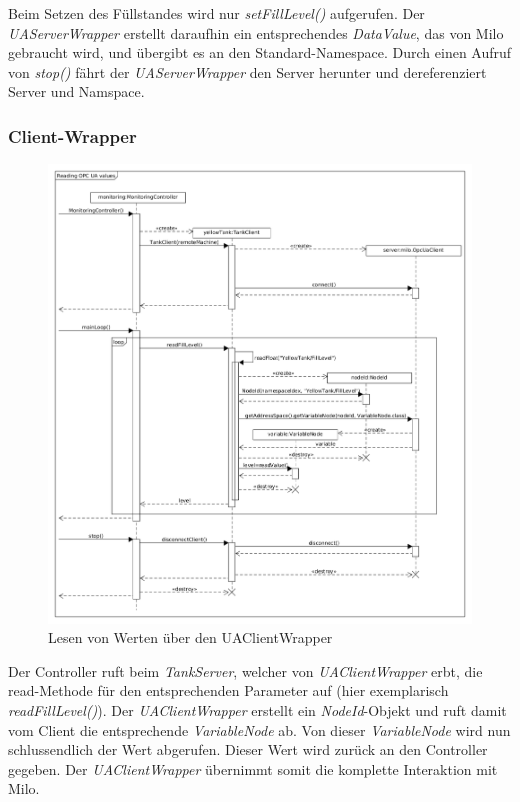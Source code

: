 \documentclass[parskip=full]{scrartcl}
\begin{document}
Beim Setzen des Füllstandes wird nur \emph{setFillLevel()} aufgerufen. Der \emph{UAServerWrapper} erstellt daraufhin
ein entsprechendes \emph{DataValue}, das von Milo gebraucht wird, und übergibt es an den Standard-Namespace.
Durch einen Aufruf von \emph{stop()} fährt der \emph{UAServerWrapper} den Server herunter und dereferenziert
Server und Namspace.

\subsubsection{Client-Wrapper}
\label{milo-wrapper-diagram}
\begin{figure}[H]
  \centering
  \includegraphics[scale=0.4]{design/sequence-diagrams/sequence-read-client-value.png}
  \caption{Lesen von Werten über den UAClientWrapper}
\end{figure}
Der Controller ruft beim \emph{TankServer}, welcher von \emph{UAClientWrapper} erbt, die read-Methode für den entsprechenden Parameter auf
(hier exemplarisch \emph{readFillLevel()}). Der \emph{UAClientWrapper} erstellt ein \emph{NodeId}-Objekt und ruft damit
vom Client die entsprechende \emph{VariableNode} ab. Von dieser \emph{VariableNode} wird nun schlussendlich der Wert abgerufen.
Dieser Wert wird zurück an den Controller gegeben. Der \emph{UAClientWrapper} übernimmt somit die
komplette Interaktion mit Milo.
\end{document}
